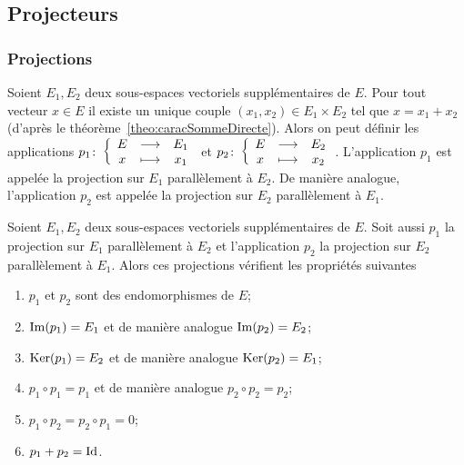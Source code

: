 \subsection{Projecteurs}

\subsubsection{Projections}
\label{sec:projections}

\begin{defdef}
  Soient \(E_1, E_2\) deux sous-espaces vectoriels supplémentaires de \(E\). 
  Pour tout vecteur \(x \in E\) il existe un unique couple \((x_1,x_2) \in E_1 
  \times E_2\) tel que \(x=x_1+x_2\) (d'après le théorème~\ref{theo:caracSommeDirecte}). Alors on peut définir les applications 
  \(p_1\colon\left\{\begin{array}{ccc}E & \longrightarrow &E_1\\x & \longmapsto & x_1\end{array}\right.\) et \(p_2\colon\left\{\begin{array}{ccc}E & \longrightarrow &E_2\\x & \longmapsto & x_2\end{array}\right.\). 
  L'application \(p_1\) est appelée la projection sur \(E_1\) parallèlement à 
  \(E_2\). De manière analogue, l'application \(p_2\) est appelée la projection 
  sur \(E_2\) parallèlement à \(E_1\).
\end{defdef}

\begin{theo}\label{theo:propprojection}
  Soient \(E_1, E_2\) deux sous-espaces vectoriels supplémentaires de \(E\). 
  Soit aussi \(p_1\) la projection sur \(E_1\) parallèlement à \(E_2\) et 
  l'application \(p_2\) la projection sur \(E_2\) parallèlement à \(E_1\). Alors 
  ces projections vérifient les propriétés suivantes
  \begin{enumerate}
    \item \(p_1\) et \(p_2\) sont des endomorphismes de \(E\);
    \item \(\operatorname{Im}(p_1)=E_1\) et de manière analogue \(\operatorname{Im}(p_2)=E_2\);
    \item \(\operatorname{Ker}(p_1)=E_2\) et de manière analogue \(\operatorname{Ker}(p_2)=E_1\);
    \item \(p_1 \circ p_1=p_1\) et de manière analogue \(p_2 \circ p_2=p_2\);
    \item \(p_1 \circ p_2 = p_2 \circ p_1=0\);
    \item \(p_1+p_2=\operatorname{Id}\).
  \end{enumerate}
\end{theo}


